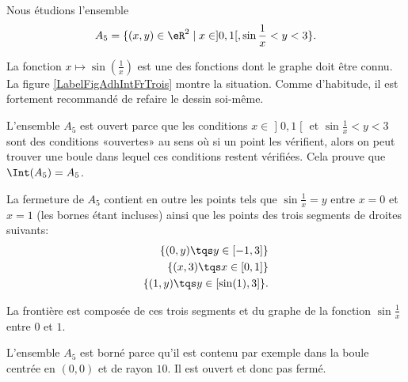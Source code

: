 \begin{example}
	Nous étudions l'ensemble
	\begin{equation}
		A_5 = \{ (x, y ) \in \eR^2 \; | \; x \in ]0, 1[, \sin \frac 1x < y < 3 \}.
	\end{equation}

	La fonction \( x\mapsto\sin(\frac{1}{ x })\) est une des fonctions dont le graphe doit être connu. La figure \ref{LabelFigAdhIntFrTrois} montre la situation. Comme d'habitude, il est fortement recommandé de refaire le dessin soi-même.
	\newcommand{\CaptionFigAdhIntFrTrois}{Les points qui sont sur l'axe vertical entre \( 0\) et \( 3\) sont sur la frontière, mais pas dans l'ensemble \( A_5\).}
	

	L'ensemble \( A_5\) est ouvert parce que les conditions \( x\in\mathopen] 0 , 1 \mathclose[\) et \( \sin\frac{1}{ x }<y<3\) sont des conditions «ouvertes» au sens où si un point les vérifient, alors on peut trouver une boule dans lequel ces conditions restent vérifiées. Cela prouve que \( \Int(A_5)=A_5\).

	La fermeture de \( A_5\) contient en outre les points tels que \( \sin\frac{1}{ x }=y\) entre \( x=0\) et \( x=1\) (les bornes étant incluses) ainsi que les points des trois segments de droites suivants:
	\begin{equation}
		\begin{aligned}[]
			\{ (0,y)\tqs y\in\mathopen[ -1 , 3 \mathclose] \} \\
			\{ (x,3)\tqs x\in\mathopen[ 0 , 1 \mathclose] \}  \\
			\{ (1,y)\tqs y\in\mathopen[ \sin(1) , 3 \mathclose] \}.
		\end{aligned}
	\end{equation}

	La frontière est composée de ces trois segments et du graphe de la fonction \( \sin\frac{1}{ x }\) entre \( 0\) et \( 1\).

	L'ensemble \( A_5\) est borné parce qu'il est contenu par exemple dans la boule centrée en \( (0,0)\) et de rayon \( 10\). Il est ouvert et donc pas fermé.
\end{example}


